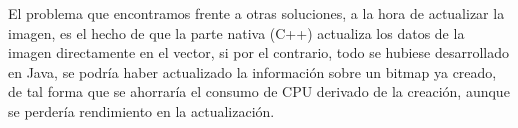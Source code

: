 El problema que encontramos frente a otras soluciones, a la hora de actualizar la imagen, es el hecho de que la parte nativa (C++) actualiza los datos de la imagen directamente en el vector, si por el contrario, todo se hubiese desarrollado en Java, se podría haber actualizado la información sobre un bitmap ya creado, de tal forma que se ahorraría el consumo de CPU derivado de la creación, aunque se perdería rendimiento en la actualización.
